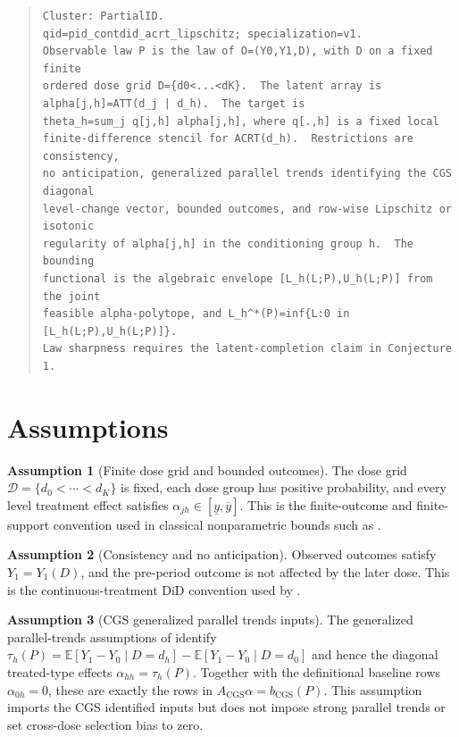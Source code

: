 \documentclass[11pt]{article}
\newcommand{\E}{\mathbb{E}}
\theoremstyle{definition}
\newtheorem{assumption}{Assumption}
\theoremstyle{plain}
\theoremstyle{remark}
\begin{document}
\begin{quote}
\begin{verbatim}
Cluster: PartialID.
qid=pid_contdid_acrt_lipschitz; specialization=v1.
Observable law P is the law of O=(Y0,Y1,D), with D on a fixed finite
ordered dose grid D={d0<...<dK}.  The latent array is
alpha[j,h]=ATT(d_j | d_h).  The target is
theta_h=sum_j q[j,h] alpha[j,h], where q[.,h] is a fixed local
finite-difference stencil for ACRT(d_h).  Restrictions are consistency,
no anticipation, generalized parallel trends identifying the CGS diagonal
level-change vector, bounded outcomes, and row-wise Lipschitz or isotonic
regularity of alpha[j,h] in the conditioning group h.  The bounding
functional is the algebraic envelope [L_h(L;P),U_h(L;P)] from the joint
feasible alpha-polytope, and L_h^*(P)=inf{L:0 in [L_h(L;P),U_h(L;P)]}.
Law sharpness requires the latent-completion claim in Conjecture 1.
\end{verbatim}
\end{quote}

\section{Assumptions}
\begin{assumption}[Finite dose grid and bounded outcomes]\label{ass:grid-bounds}
The dose grid \(\mathcal D=\{d_0<\cdots<d_K\}\) is fixed, each dose group has
positive probability, and every level treatment effect satisfies
\(\alpha_{j h}\in[\underline y,\overline y]\).  This is the finite-outcome
and finite-support convention used in classical nonparametric bounds such as
\citet{ManskiPepper2000}.
\end{assumption}

\begin{assumption}[Consistency and no anticipation]\label{ass:consistency-noanticip}
Observed outcomes satisfy \(Y_1=Y_1(D)\), and the pre-period outcome is not
affected by the later dose.  This is the continuous-treatment DiD convention
used by \citet{CallawayGoodmanBaconSantAnna2021}.
\end{assumption}

\begin{assumption}[CGS generalized parallel trends inputs]\label{ass:cgs-inputs}
The generalized parallel-trends assumptions of
\citet{CallawayGoodmanBaconSantAnna2021} identify
\(\tau_h(P)=\E[Y_1-Y_0\mid D=d_h]-\E[Y_1-Y_0\mid D=d_0]\) and hence the
diagonal treated-type effects \(\alpha_{hh}=\tau_h(P)\).  Together with the
definitional baseline rows \(\alpha_{0h}=0\), these are exactly the rows in
\(A_{\mathrm{CGS}}\alpha=b_{\mathrm{CGS}}(P)\).  This assumption imports the
CGS identified inputs but does not impose strong parallel trends or set
cross-dose selection bias to zero.
\end{assumption}
\end{document}
